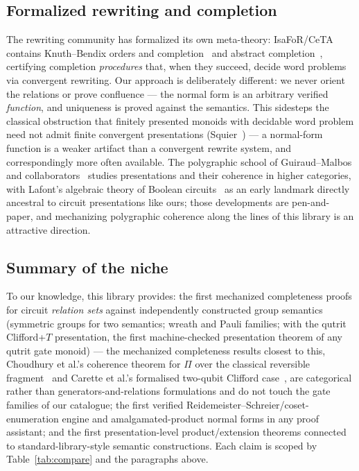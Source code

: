 \subsection{Formalized rewriting and completion}

The rewriting community has formalized its own meta-theory: IsaFoR/CeTA
contains Knuth--Bendix orders and completion~\cite{sternagel2013kb} and
abstract completion~\cite{hirokawa2019abstract}, certifying completion
\emph{procedures} that, when they succeed, decide word problems via
convergent rewriting.  Our approach is deliberately different: we never
orient the relations or prove confluence --- the normal form is an
arbitrary verified \emph{function}, and uniqueness is proved against the
semantics.  This sidesteps the classical obstruction that finitely
presented monoids with decidable word problem need not admit finite
convergent presentations (Squier~\cite{squier1987word,
squier1994finiteness}) --- a normal-form function is a weaker artifact
than a convergent rewrite system, and correspondingly more often
available.  The polygraphic school of Guiraud--Malbos and
collaborators~\cite{guiraud2018polygraphs,ara2025polygraphs} studies
presentations and their coherence in higher categories, with Lafont's
algebraic theory of Boolean circuits~\cite{lafont2003boolean} as an early
landmark directly ancestral to circuit presentations like ours; those
developments are pen-and-paper, and mechanizing polygraphic coherence
along the lines of this library is an attractive direction.

\subsection{Summary of the niche}

To our knowledge, this library provides: the first mechanized
completeness proofs for circuit \emph{relation sets} against
independently constructed group semantics (symmetric groups for two
semantics; wreath and Pauli families; with the qutrit Clifford+$T$
presentation, the first machine-checked presentation theorem of any
qutrit gate monoid) --- the mechanized completeness results closest to
this, Choudhury et al.'s coherence theorem for $\Pi$ over the classical
reversible fragment~\cite{choudhury2022symmetries} and Carette et al.'s
formalised two-qubit Clifford case~\cite{carette2024squareroots}, are
categorical rather than generators-and-relations formulations and do not
touch the gate families of our catalogue; the first verified
Reidemeister--Schreier/coset-enumeration
engine and amalgamated-product normal forms in any proof assistant; and
the first presentation-level product/extension theorems connected to
standard-library-style semantic constructions.  Each claim is scoped by
Table~\ref{tab:compare} and the paragraphs above.
